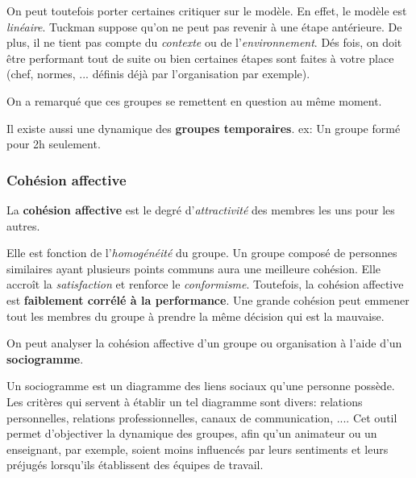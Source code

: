 \documentclass[12pt]{article}
\begin{document}
		On peut toutefois porter certaines critiquer sur le modèle. En effet, le modèle est \textit{linéaire}. Tuckman suppose qu'on ne peut pas revenir à une étape antérieure. De plus, il ne tient pas compte du \textit{contexte} ou de l'\textit{environnement}. Dés fois, on doit être performant tout de suite ou bien certaines étapes sont faites à votre place (chef, normes, ... définis déjà par l'organisation par exemple). \newline
		
		On a remarqué que ces groupes se remettent en question au même moment.\newline
		
		Il existe aussi une dynamique des \textbf{groupes temporaires}.\newline
		ex: Un groupe formé pour 2h seulement. \newline
		
				
		\subsubsection{Cohésion affective}
		
		La \textbf{cohésion affective} est le degré d'\textit{attractivité} des membres les uns pour les autres. \newline
		
		Elle est fonction de l'\textit{homogénéité} du groupe. Un groupe composé de personnes similaires ayant plusieurs points communs aura une meilleure cohésion. Elle accroît la \textit{satisfaction} et renforce le \textit{conformisme}. Toutefois, la cohésion affective est \textbf{faiblement corrélé à la performance}. Une grande cohésion peut emmener tout les membres du groupe à prendre la même décision qui est la mauvaise. \newline
		
		On peut analyser la cohésion affective d'un groupe ou organisation à l'aide d'un \textbf{sociogramme}. \newline 
		
		Un sociogramme est un diagramme des liens sociaux qu'une personne possède. Les critères qui servent à établir un tel diagramme sont divers: relations personnelles, relations professionnelles, canaux de communication, .... Cet outil permet d'objectiver la dynamique des groupes, afin qu'un animateur ou un enseignant, par exemple, soient moins influencés par leurs sentiments et leurs préjugés lorsqu'ils établissent des équipes de travail.\newline
		
\end{document}

